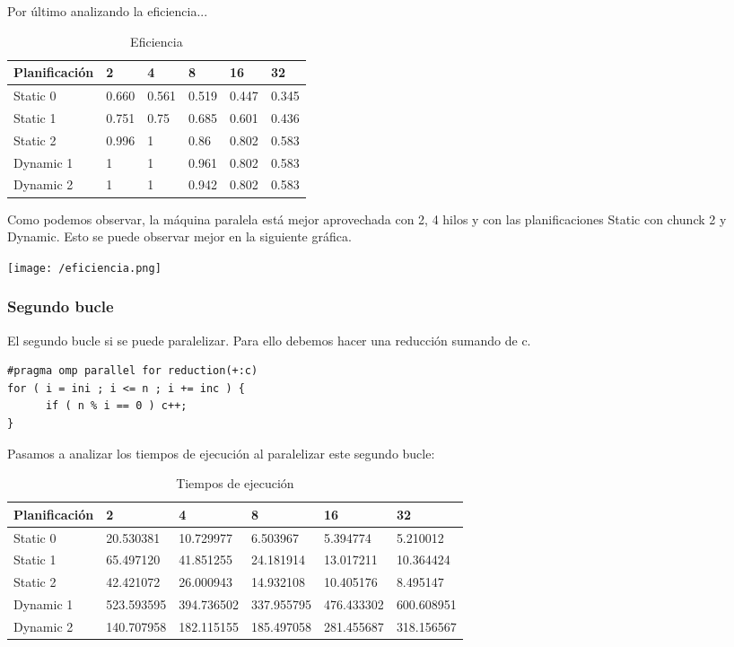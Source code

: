 \documentclass[11pt,oneside,a4paper]{article}
\begin{document}
Por último analizando la eficiencia...
\begin{table}[htbp]
\begin{center}
\begin{tabular}{|l|l||l|l||l||l|}
\hline
Planificación & 2 & 4 & 8 & 16 & 32 \\\hline 
Static 0 &  0.660 &0.561&0.519&0.447&0.345\\\hline
Static 1 & 0.751 &0.75&0.685&0.601&0.436 \\\hline
Static 2 &  0.996 &1&0.86&0.802&0.583 \\ \hline
Dynamic 1 & 1 &1&0.961&0.802&0.583 \\ \hline
Dynamic 2 &  1 &1 &0.942&0.802&0.583 \\ \hline
\end{tabular}
\caption{Eficiencia}
\label{tabla:eficiencia}
\end{center}
\end{table}

Como podemos observar, la máquina paralela está mejor aprovechada con  2, 4 hilos y con las planificaciones Static con chunck 2 y Dynamic. Esto se puede observar mejor en la siguiente gráfica.

\texttt{[image: /eficiencia.png]}

\subsubsection{Segundo bucle}
El segundo bucle si se puede paralelizar. Para ello debemos hacer una reducción sumando de c. 
\lstset{language=C, breaklines=true, basicstyle=\footnotesize}
\begin{lstlisting}[frame=single]
#pragma omp parallel for reduction(+:c)
for ( i = ini ; i <= n ; i += inc ) {
      if ( n % i == 0 ) c++;
}
\end{lstlisting}

Pasamos a analizar los tiempos de ejecución al paralelizar este segundo bucle:
\begin{table}[htbp]
\begin{center}
\begin{tabular}{|l|l||l|l||l||l|}
\hline
Planificación & 2 & 4 & 8 & 16 & 32 \\
\hline 
Static 0 & 20.530381 &10.729977 &6.503967 &5.394774 &5.210012\\\hline
Static 1 & 65.497120 &41.851255 &24.181914&13.017211&10.364424 \\\hline
Static 2 & 42.421072 &26.000943 &14.932108 &10.405176 &8.495147 \\ \hline
Dynamic 1 & 523.593595 &394.736502 &337.955795 &476.433302 &600.608951 \\ \hline
Dynamic 2 & 140.707958 &182.115155 &185.497058 &281.455687 &318.156567  \\ \hline
\end{tabular}
\caption{Tiempos de ejecución}
\label{tabla:tiempos2}
\end{center}
\end{table}
\end{document}
